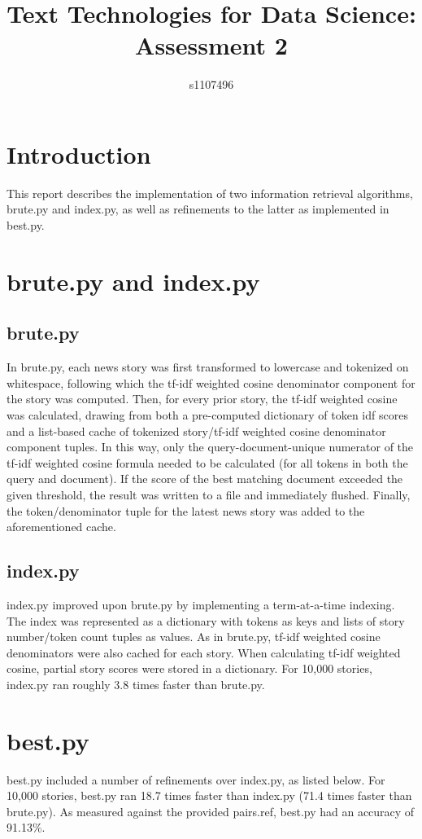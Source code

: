 \documentclass{article}
\begin{document}
\title{Text Technologies for Data Science: Assessment 2}
\author{s1107496}

\maketitle

\section{Introduction}
This report describes the implementation of two information retrieval algorithms, brute.py and index.py, as well as refinements to the latter as implemented in best.py.

\section{brute.py and index.py}
\subsection{brute.py}
In brute.py, each news story was first transformed to lowercase and tokenized on whitespace, following which the tf-idf weighted cosine denominator component for the story was computed. Then, for every prior story, the tf-idf weighted cosine was calculated, drawing from both a pre-computed dictionary of token idf scores and a list-based cache of tokenized story/tf-idf weighted cosine denominator component tuples. In this way, only the query-document-unique numerator of the tf-idf weighted cosine formula needed to be calculated (for all tokens in both the query and document).  If the score of the best matching document exceeded the given threshold, the result was written to a file and immediately flushed. Finally, the token/denominator tuple for the latest news story was added to the aforementioned cache.
\subsection{index.py}
index.py improved upon brute.py by implementing a term-at-a-time indexing. The index was represented as a dictionary with tokens as keys and lists of story number/token count tuples as values. As in brute.py, tf-idf weighted cosine denominators were also cached for each story. When calculating tf-idf weighted cosine, partial story scores were stored in a dictionary. For 10,000 stories, index.py ran roughly 3.8 times faster than brute.py.

\section{best.py}
best.py included a number of refinements over index.py, as listed below. For 10,000 stories, best.py ran 18.7 times faster than index.py (71.4 times faster than brute.py). As measured against the provided pairs.ref, best.py had an accuracy of 91.13\%.
\end{document}
